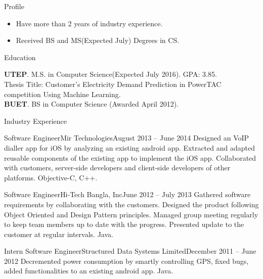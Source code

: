 \documentclass[]{mcdowellcv}
\begin{document}
	\makeheader
	
	\begin{cvsection}{Profile}
	\begin{cvsubsection}{}{}{}
		\begin{itemize}
				\item Have more than 2 years of industry experience.
				\item Received BS and MS(Expected July) Degrees in CS.
			\end{itemize}
	\end{cvsubsection}
	\end{cvsection}
	
	\begin{cvsection}{Education}
		\begin{cvsubsection}{}{}{}
				\textbf{UTEP}. M.S. in Computer Science(Expected July 2016). GPA: 3.85. \\
				Thesis Title: Customer's Electricity Demand Prediction in PowerTAC competition Using Machine Learning. \\
				\textbf{BUET}. BS in Computer Science (Awarded April 2012).  
		\end{cvsubsection}
	\end{cvsection}

	\begin{cvsection}{Industry Experience}
		
		\begin{cvsubsection}{Software Engineer}{Mir Technologies}{August 2013 -- June 2014}
		Designed an VoIP dialler app for iOS by analyzing an existing android app. Extracted and adapted reusable components of the existing app to implement the iOS app. Collaborated with customers, server-side developers and client-side developers of other platforms. Objective-C, C++.
\end{cvsubsection}		
		\begin{cvsubsection}{Software Engineer}{Hi-Tech Bangla, Inc}{June 2012 -- July 2013}	
 Gathered software requirements by collaborating with the customers. Designed the product following Object Oriented and Design Pattern principles. Managed  group meeting regularly to keep  team members up to date with the progress. Presented  update to the customer at regular intervals. Java.
			
		\end{cvsubsection}

		\begin{cvsubsection}{Intern Software Engineer}{Structured Data Systems Limited}{December 2011 -- June 2012}	
			Decremented power consumption by smartly controlling GPS, fixed bugs, added functionalities to an existing android app. Java.
		\end{cvsubsection}
	\end{cvsection}
	
\end{document}
